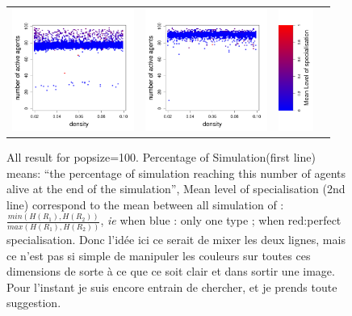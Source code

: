 \documentclass[a4paper]{article}
\begin{document}
\begin{figure}
\begin{tabular}[H]{cccl}
	\includegraphics[height=4cm]{img/slice_spec_rep-75.pdf} &
	\includegraphics[height=4cm]{img/slice_spec_rep-90.pdf} &
	\includegraphics[height=4cm]{img/legLofS.pdf} \\
    \end{tabular}
    \caption{All result for popsize=100. Percentage of Simulation(first line) means: ``the percentage of simulation reaching this number of agents alive at the end of the simulation'',	Mean level of specialisation (2nd line) correspond to the mean between all simulation of : $\frac{min(H(R_1),H(R_2))}{max(H(R_1),H(R_2))}$, \emph{ie} when blue : only one type ; when red:perfect specialisation.
Donc l'idée ici ce serait de mixer les deux lignes, mais ce n'est pas si simple de manipuler les couleurs sur toutes ces dimensions de sorte à ce que ce soit clair et dans sortir une image. Pour l'instant je suis encore entrain de chercher, et je prends toute suggestion.
}
    \label{table:heatmaps}
\end{figure}
\end{document}
